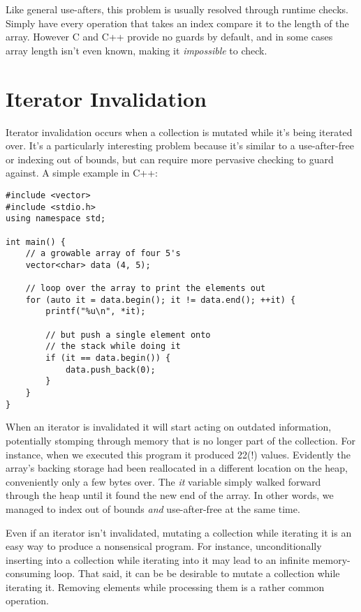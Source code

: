 Like general use-afters, this problem is usually resolved through runtime
checks. Simply have every operation that takes an index compare it to the length of the
array. However C and C++ provide no guards by default, and in some cases array
length isn't even known, making it \emph{impossible} to check.





\section{Iterator Invalidation}

Iterator invalidation occurs when a collection is mutated while it's being iterated
over. It's a particularly interesting problem because it's similar to a
use-after-free or indexing out of bounds, but can require more pervasive checking
to guard against. A simple example in C++:

\begin{verbatim}
#include <vector>
#include <stdio.h>
using namespace std;

int main() {
    // a growable array of four 5's
    vector<char> data (4, 5);

    // loop over the array to print the elements out
    for (auto it = data.begin(); it != data.end(); ++it) {
        printf("%u\n", *it);

        // but push a single element onto
        // the stack while doing it
        if (it == data.begin()) {
            data.push_back(0);
        }
    }
}
\end{verbatim}

When an iterator is invalidated it will start acting on
outdated information, potentially stomping through memory that is no longer
part of the collection. For instance, when we executed this program it produced
22(!) values. Evidently the array's backing storage had been reallocated
in a different location on the heap, conveniently only a few bytes over. The \emph{it}
variable simply walked forward through the heap until it found the new end of
the array. In other words, we managed to index out of bounds \emph{and} use-after-free
at the same time.

Even if an iterator isn't invalidated, mutating a collection
while iterating it is an easy way to produce a nonsensical program. For instance,
unconditionally inserting into a collection while iterating into it may lead
to an infinite memory-consuming loop. That said, it can be be desirable to
mutate a collection while iterating it. Removing elements while processing them
is a rather common operation.

